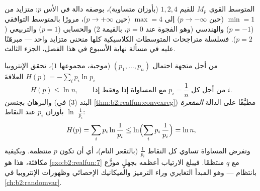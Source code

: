 \begin{omfigure}

{\small المتوسط القوي $M_p$ للقيم $1, 2, 4$ (بأوزان
متساوية)، بوصفه دالة في الأس $p$: متزايد من
$\min = 1$ (حين $p \to -\infty$) إلى $\max = 4$ (حين $p \to
+\infty$)، مرورًا بالمتوسط التوافقي ($p = -1$) والهندسي (وهو الفجوة
عند $p = 0$، بالقيمة $2$) والحسابي ($p = 1$) والتربيعي ($p
= 2$). فسلسلة متراجحات المتوسطات الكلاسيكية كلها
منحنى متزايد واحد --- مبرهَنًا عليه في مسألة نهاية الأسبوع
في هذا الفصل، الجزء الثالث.}
\end{omfigure}

\begin{example}\label{ex:b2:realfun:entropy}
من أجل متجهة احتمال $(p_1, \dots, p_n)$ (موجبة،
مجموعها $1$)، تحقق الإنتروبيا $H(p) = -\sum_i p_i\ln p_i$
العلاقةَ
\[
H(p) \leq \ln n ,
\qquad\text{مع المساواة إذا وفقط إذا } p_i = \frac1n \text{ من أجل كل }
i .
\]
والبرهان بجنسن (البند (3) في \cref{thm:b2:realfun:convexreg}) مطبَّقًا على
الدالة \emph{المقعرة} $\ln$ بأوزان $p_i$ عند النقاط
$\frac{1}{p_i}$:
\[
H(p) = \sum_i p_i\ln\frac{1}{p_i}
\leq \ln\Bigl(\sum_i p_i\,\frac1{p_i}\Bigr) = \ln n ,
\]
وتفرض المساواة تساوي كل النقاط $\frac1{p_i}$ (بالتقعر
التام)، أي أن تكون $p$ منتظمة. وبكيفية مكافئة، هذا هو
\cref{exo:b2:realfun:7} مع $q$ منتظمًا. فيبلغ الارتياب أعظمه
بجهلٍ موزَّع بانتظام --- وهو المبدأ التغايري
وراء الترميز والميكانيك الإحصائي وظهورات الإنتروبيا
في \cref{ch:b2:randomvar}.
\end{example}

